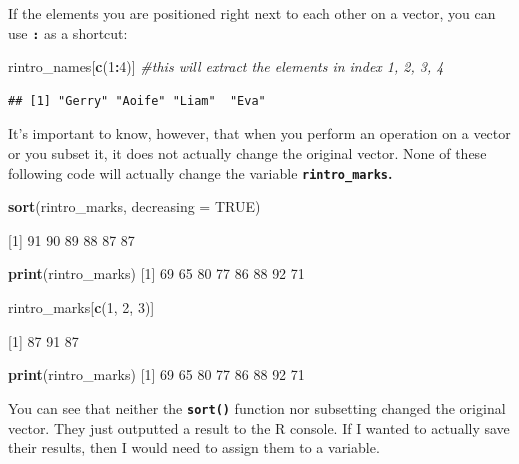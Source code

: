 \documentclass[
]{book}
\newenvironment{Shaded}{\begin{snugshade}}{\end{snugshade}}
\newcommand{\AttributeTok}[1]{\textcolor[rgb]{0.13,0.29,0.53}{#1}}
\newcommand{\CommentTok}[1]{\textcolor[rgb]{0.56,0.35,0.01}{\textit{#1}}}
\newcommand{\ConstantTok}[1]{\textcolor[rgb]{0.56,0.35,0.01}{#1}}
\newcommand{\DecValTok}[1]{\textcolor[rgb]{0.00,0.00,0.81}{#1}}
\newcommand{\FunctionTok}[1]{\textcolor[rgb]{0.13,0.29,0.53}{\textbf{#1}}}
\newcommand{\NormalTok}[1]{#1}
\newcommand{\SpecialCharTok}[1]{\textcolor[rgb]{0.81,0.36,0.00}{\textbf{#1}}}
\begin{document}
If the elements you are positioned right next to each other on a vector, you can use \textbf{\texttt{:}} as a shortcut:

\begin{Shaded}
\begin{Highlighting}[]
\NormalTok{rintro\_names[}\FunctionTok{c}\NormalTok{(}\DecValTok{1}\SpecialCharTok{:}\DecValTok{4}\NormalTok{)] }\CommentTok{\#this will extract the elements in index 1, 2, 3, 4}
\end{Highlighting}
\end{Shaded}

\begin{verbatim}
## [1] "Gerry" "Aoife" "Liam"  "Eva"
\end{verbatim}

It's important to know, however, that when you perform an operation on a vector or you subset it, it does not actually change the original vector. None of these following code will actually change the variable \textbf{\texttt{rintro\_marks}.}

\begin{Shaded}
\begin{Highlighting}[]
\FunctionTok{sort}\NormalTok{(rintro\_marks, }\AttributeTok{decreasing =} \ConstantTok{TRUE}\NormalTok{)}

\NormalTok{[}\DecValTok{1}\NormalTok{] }\DecValTok{91} \DecValTok{90} \DecValTok{89} \DecValTok{88} \DecValTok{87} \DecValTok{87}

\FunctionTok{print}\NormalTok{(rintro\_marks)}
\NormalTok{[}\DecValTok{1}\NormalTok{] }\DecValTok{69} \DecValTok{65} \DecValTok{80} \DecValTok{77} \DecValTok{86} \DecValTok{88} \DecValTok{92} \DecValTok{71}

\NormalTok{rintro\_marks[}\FunctionTok{c}\NormalTok{(}\DecValTok{1}\NormalTok{, }\DecValTok{2}\NormalTok{, }\DecValTok{3}\NormalTok{)]}

\NormalTok{[}\DecValTok{1}\NormalTok{] }\DecValTok{87} \DecValTok{91} \DecValTok{87}

\FunctionTok{print}\NormalTok{(rintro\_marks)}
\NormalTok{[}\DecValTok{1}\NormalTok{] }\DecValTok{69} \DecValTok{65} \DecValTok{80} \DecValTok{77} \DecValTok{86} \DecValTok{88} \DecValTok{92} \DecValTok{71}
\end{Highlighting}
\end{Shaded}

You can see that neither the \textbf{\texttt{sort()}} function nor subsetting changed the original vector. They just outputted a result to the R console. If I wanted to actually save their results, then I would need to assign them to a variable.
\end{document}
